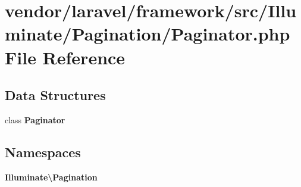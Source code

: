 \section{vendor/laravel/framework/src/\+Illuminate/\+Pagination/\+Paginator.php File Reference}
\label{_pagination_2_paginator_8php}
\subsection*{Data Structures}
\begin{DoxyCompactItemize}
\item 
class {\bf Paginator}
\end{DoxyCompactItemize}
\subsection*{Namespaces}
\begin{DoxyCompactItemize}
\item 
 {\bf Illuminate\textbackslash{}\+Pagination}
\end{DoxyCompactItemize}
